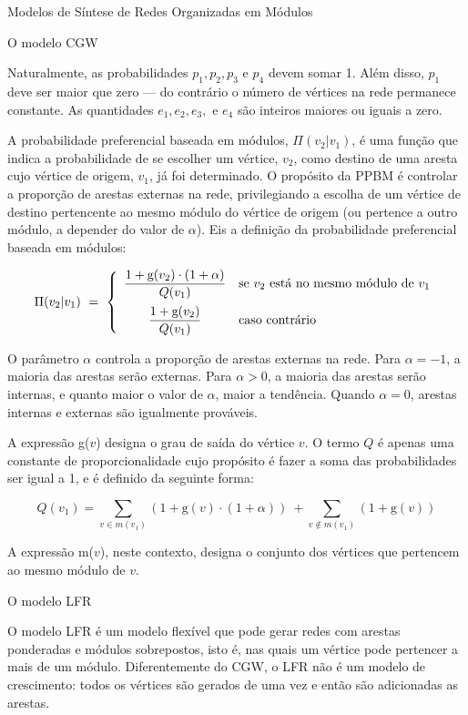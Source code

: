 \begin{section}{Modelos de Síntese de Redes Organizadas em Módulos}
\begin{subsection}{O modelo CGW}
\begin{itemize}
\end{itemize}

Naturalmente, as probabilidades $p_1, p_2, p_3$ e $p_4$ devem somar 1. Além disso, $p_1$ deve ser maior que zero --- do contrário o número de vértices na rede permanece constante. As quantidades $e_1, e_2, e_3, $ e $e_4$ são inteiros maiores ou iguais a zero.

A probabilidade preferencial baseada em módulos, $\Pi(v_2|v_1)$, é uma função que indica a probabilidade de se escolher um vértice, $v_2$, como destino de uma aresta cujo vértice de origem, $v_1$, já foi determinado. O propósito da PPBM é controlar a proporção de arestas externas na rede, privilegiando a escolha de um vértice de destino pertencente ao mesmo módulo do vértice de origem (ou pertence a outro módulo, a depender do valor de $\alpha$). Eis a definição da probabilidade preferencial baseada em módulos:

$$
\Pi (v_2|v_1) ~=~
\left\{
\begin{array}{cl}
\dfrac{1 + \mathrm{g}(v_2) \cdot (1 + \alpha)}{Q(v_1)} 
  & \mbox{se $v_2$ está no mesmo módulo de $v_1$} \vspace{0.5em} \\ 
\dfrac{1 + \mathrm{g}(v_2)}{Q(v_1)} 
  & \mbox{caso contrário}
\end{array}
\right.
$$

O parâmetro $\alpha$ controla a proporção de arestas externas na rede. Para $\alpha = -1$, a maioria das arestas serão externas. Para $\alpha > 0$, a maioria das arestas serão internas, e quanto maior o valor de $\alpha$, maior a tendência. Quando $\alpha = 0$, arestas internas e externas são igualmente prováveis.

A expressão g($v$) designa o grau de saída do vértice $v$. O termo $Q$ é apenas uma constante de proporcionalidade cujo propósito é fazer a soma das probabilidades ser igual a 1, e é definido da seguinte forma:

$$
Q(v_1) = \sum_{v \in m(v_1)} (1 + \mathrm{g}(v) \cdot (1 + \alpha))
~+ \sum_{v \notin m(v_1)} (1 + \mathrm{g}(v))
$$

A expressão m($v$), neste contexto, designa o conjunto dos vértices que pertencem ao mesmo módulo de $v$.

\end{subsection}

\begin{subsection}{O modelo LFR}

O modelo LFR \cite{Lancichinetti2008,Lancichinetti2009} é um modelo flexível que pode gerar redes com arestas ponderadas e módulos sobrepostos, isto é, nas quais um vértice pode pertencer a mais de um módulo. Diferentemente do CGW, o LFR não é um modelo de crescimento: todos os vértices são gerados de uma vez e então são adicionadas as arestas.


\end{subsection}
\end{section}

